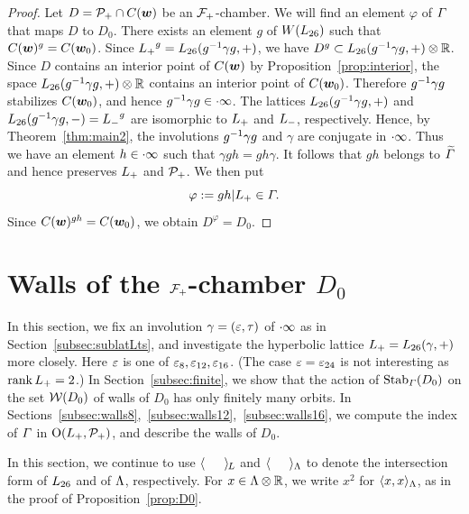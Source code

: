 \documentclass{amsart} %
\begin{document}
\begin{proof}
Let $D=\mathord{\mathcal{P}}_{+} \cap \mathord{C}(\boldsymbol{w})$ be an $\mathord{\mathcal{F}}_{+}$-chamber.
We will find an element $\varphi$ of $\varGamma$ 
that maps $D$ to $D_0$.
There exists an element $g$ of $W(L_{26})$
such that $\mathord{C}(\boldsymbol{w})^g=\mathord{C}(\boldsymbol{w}_0)$.
Since ${L_{+}}^g=L_{26}(g^{-1} \gamma g, +)$, 
we have $D^g\subset L_{26}(g^{-1} \gamma g, +)\otimes \mathord{\mathbb{R}}$.
Since $D$ contains an interior point of $\mathord{C}(\boldsymbol{w})$ by 
Proposition~\ref{prop:interior},
the space $L_{26}(g^{-1} \gamma g, +)\otimes \mathord{\mathbb{R}}$ contains an interior point of $\mathord{C}(\boldsymbol{w}_0)$.
Therefore $g^{-1} \gamma g$ stabilizes $\mathord{C}(\boldsymbol{w}_0)$,
and hence $g^{-1} \gamma g \in \cdot \infty$.
The lattices $L_{26}(g^{-1} \gamma g, + )$ and $L_{26}(g^{-1} \gamma g, -)={L_{-}}^g$
are isomorphic to $L_{+}$ and $L_{-}$, respectively.
Hence, by Theorem~\ref{thm:main2},
the involutions $g^{-1} \gamma g$ and $\gamma$ are conjugate in $\cdot \infty$.
Thus we have an element $h\in \cdot \infty$
such that $\gamma g h =gh\gamma $.
It follows that $gh$ belongs to $\widetilde{\varGamma}$ and hence preserves $L_{+}$ and $\mathord{\mathcal{P}}_{+}$.
We then put
\[
\varphi:=gh|L_{+}\in \varGamma.
\]
Since $\mathord{C}(\boldsymbol{w})^{gh}=\mathord{C}(\boldsymbol{w}_0)$,
we obtain $D^\varphi=D_0$.
\end{proof}
%
%
%
\section{Walls of the $\mathord{\mathcal{F}}_{+}$-chamber $D_0$}\label{sec:wallsD0}
%
In this section, 
we fix an involution $\gamma=(\varepsilon, \tau)$ of $\cdot \infty$ as in Section~\ref{subsec:sublatLts},
 and  investigate the hyperbolic lattice $L_{+}=L_{26}(\gamma, +)$
 more closely.
 Here $\varepsilon$ is one of $\varepsilon_8, \varepsilon_{12}, \varepsilon_{16}$.
(The case $\varepsilon=\varepsilon_{24}$ is not interesting as $\operatorname{rank} L_{+}=2$.)
In Section~\ref{subsec:finite},
we show that 
the action of $\operatorname{Stab}_{\varGamma}(D_0)$ on the set $\mathord{\mathcal{W}}(D_0)$ of 
walls of $D_0$ has only finitely many orbits.
In Sections~\ref{subsec:walls8},~\ref{subsec:walls12},~\ref{subsec:walls16}, 
we compute the index of $\varGamma$ in
$\mathord{\mathrm{O}}(L_{+}, \mathord{\mathcal{P}}_{+})$,
and describe the walls of $D_0$.
%
\par
In this section,
we continue to use
$\langle \phantom{a, a} \rangle_{\hskip -1pt L}$ and $\langle \phantom{a, a} \rangle_{\Lambda}$ 
to denote the intersection form of $L_{26}$
and of $\Lambda$, respectively.
For $x\in \Lambda\otimes\mathord{\mathbb{R}}$, we write $x^2$ for $\langle x,x \rangle_{\Lambda}$,
as in the proof of Proposition~\ref{prop:D0}.
%
\end{document}
